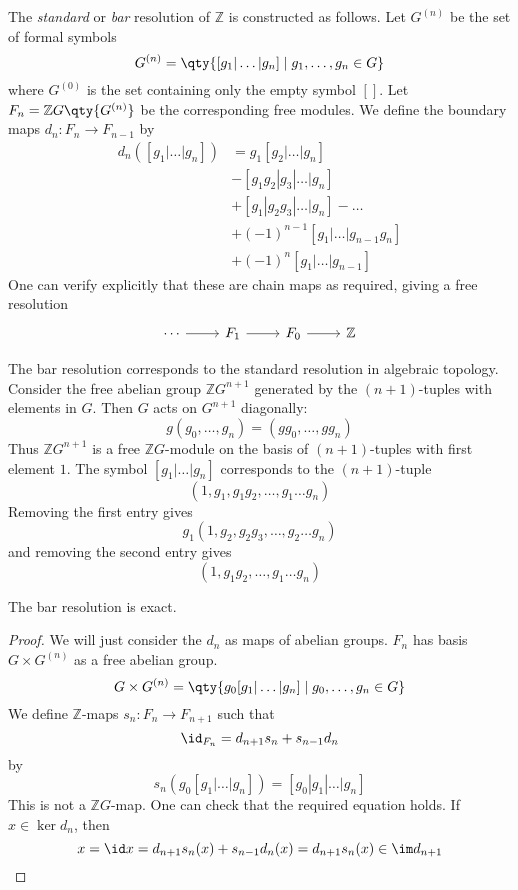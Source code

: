 \begin{definition}
    The \emph{standard} or \emph{bar} resolution of \( \mathbb Z \) is constructed as follows.
    Let \( G^{(n)} \) be the set of formal symbols
    \[ G^{(n)} = \qty{[g_1 | \dots | g_n] \mid g_1, \dots, g_n \in G} \]
    where \( G^{(0)} \) is the set containing only the empty symbol \( [] \).
    Let \( F_n = \mathbb Z G \qty{G^{(n)}} \) be the corresponding free modules.
    We define the boundary maps \( d_n : F_n \to F_{n-1} \) by
    \begin{align*}
        d_n([g_1 | \dots | g_n]) &= g_1[g_2 | \dots | g_n] \\
        &- [g_1 g_2 | g_3 | \dots | g_n] \\
        &+ [g_1 | g_2 g_3 | \dots | g_n] - \dots \\
        &+ (-1)^{n-1} [g_1 | \dots | g_{n-1} g_n] \\
        &+ (-1)^n [g_1 | \dots | g_{n-1}]
    \end{align*}
    One can verify explicitly that these are chain maps as required, giving a free resolution
\[\begin{tikzcd}
	\cdots & {F_1} & {F_0} & {\mathbb Z}
	\arrow[from=1-1, to=1-2]
	\arrow[from=1-2, to=1-3]
	\arrow[from=1-3, to=1-4]
\end{tikzcd}\]
\end{definition}
\begin{remark}
    The bar resolution corresponds to the standard resolution in algebraic topology.
    Consider the free abelian group \( \mathbb Z G^{n+1} \) generated by the \( (n + 1) \)-tuples with elements in \( G \).
    Then \( G \) acts on \( G^{n+1} \) diagonally:
    \[ g(g_0, \dots, g_n) = (gg_0, \dots, gg_n) \]
    Thus \( \mathbb Z G^{n+1} \) is a free \( \mathbb Z G \)-module on the basis of \( (n + 1) \)-tuples with first element \( 1 \).
    The symbol \( [g_1 | \dots | g_n] \) corresponds to the \( (n + 1) \)-tuple
    \[ (1, g_1, g_1 g_2, \dots, g_1 \dots g_n) \]
    Removing the first entry gives
    \[ g_1 (1, g_2, g_2 g_3, \dots, g_2 \dots g_n) \]
    and removing the second entry gives
    \[ (1, g_1 g_2, \dots, g_1 \dots g_n) \]
\end{remark}
\begin{lemma}
    The bar resolution is exact.
\end{lemma}
\begin{proof}
    We will just consider the \( d_n \) as maps of abelian groups.
    \( F_n \) has basis \( G \times G^{(n)} \) as a free abelian group.
    \[ G \times G^{(n)} = \qty{g_0 [g_1 | \dots | g_n] \mid g_0, \dots, g_n \in G} \]
    We define \( \mathbb Z \)-maps \( s_n : F_n \to F_{n+1} \) such that
    \[ \id_{F_n} = d_{n+1} s_n + s_{n-1} d_n \]
    by
    \[ s_n(g_0[g_1 | \dots | g_n]) = [g_0 | g_1 | \dots | g_n] \]
    This is not a \( \mathbb Z G \)-map.
    One can check that the required equation holds.
    If \( x \in \ker d_n \), then
    \[ x = \id x = d_{n+1} s_n(x) + s_{n-1} d_n(x) = d_{n+1} s_n(x) \in \im d_{n+1} \]
\end{proof}
